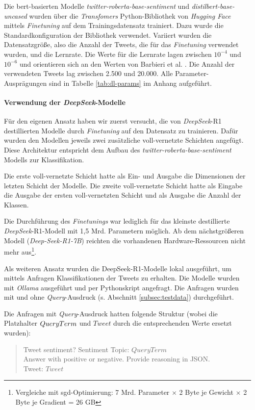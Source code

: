 Die \gls{bert}-basierten Modelle \textit{twitter-roberta\hyp{}base\hyp{}sentiment} und \textit{distilbert-base-uncased} wurden über die \textit{Transfomers} Python-Bibliothek von \textit{Hugging Face} mittels \textit{Finetuning} auf dem Trainingsdatensatz trainiert.
Dazu wurde die Standardkonfiguration der Bibliothek verwendet.
Variiert wurden die Datensatzgröße, also die Anzahl der Tweets, die für das \textit{Finetuning} verwendet wurden, und die Lernrate.
Die Werte für die Lernrate lagen zwischen $10^{-4}$ und $10^{-6}$ und orientieren sich an den Werten von Barbieri et al. \cite{barbieri2020tweeteval}.
Die Anzahl der verwendeten Tweets lag zwischen 2.500 und 20.000.
Alle Parameter-Ausprägungen sind in Tabelle \ref{tab:dl-params} im Anhang aufgeführt.

\paragraph{Verwendung der \textit{DeepSeek}-Modelle}

Für den eigenen Ansatz haben wir zuerst versucht, die von \textit{DeepSeek}-R1 destillierten Modelle durch \textit{Finetuning} auf den Datensatz zu trainieren.
Dafür wurden den Modellen jeweils zwei zusätzliche voll-vernetzte Schichten angefügt.
Diese Architektur entspricht dem Aufbau des \textit{twitter-roberta-base-sentiment} Modells zur Klassifikation.

Die erste voll-vernetzte Schicht hatte als Ein- und Ausgabe die Dimensionen der letzten Schicht der Modelle.
Die zweite voll-vernetzte Schicht hatte als Eingabe die Ausgabe der ersten voll-vernetzten Schicht und als Ausgabe die Anzahl der Klassen.

Die Durchführung des \textit{Finetunings} war lediglich für das kleinste destillierte \textit{DeepSeek}-R1-Modell mit 1,5 Mrd. Parametern möglich.
Ab dem nächstgrößeren Modell (\textit{Deep\hyp{}Seek-R1-7B}) reichten die vorhandenen Hardware-Ressourcen nicht mehr aus\footnote{Vergleiche mit \gls{sgd}-Optimierung: 7 Mrd. Parameter $\times$ 2 Byte je Gewicht $\times$ 2 Byte je Gradient = 26 GB}.

Als weiteren Ansatz wurden die DeepSeek-R1-Modelle lokal ausgeführt, um mittels Anfragen Klassifikationen der Tweets zu erhalten.
Die Modelle wurden mit \textit{Ollama} ausgeführt und per Pythonskript angefragt.
Die Anfragen wurden mit und ohne \textit{Query}-Ausdruck (s. Abschnitt \ref{subsec:testdata}) durchgeführt.

Die Anfragen mit \textit{Query}-Ausdruck hatten folgende Struktur (wobei die Platzhalter $Query\-Term$ und $Tweet$ durch die entsprechenden Werte ersetzt wurden):
\begin{quote}
    Tweet sentiment? Sentiment Topic: $QueryTerm$\\
    Answer with positive or negative. Provide reasoning in JSON.\\
    Tweet: $Tweet$
\end{quote}

